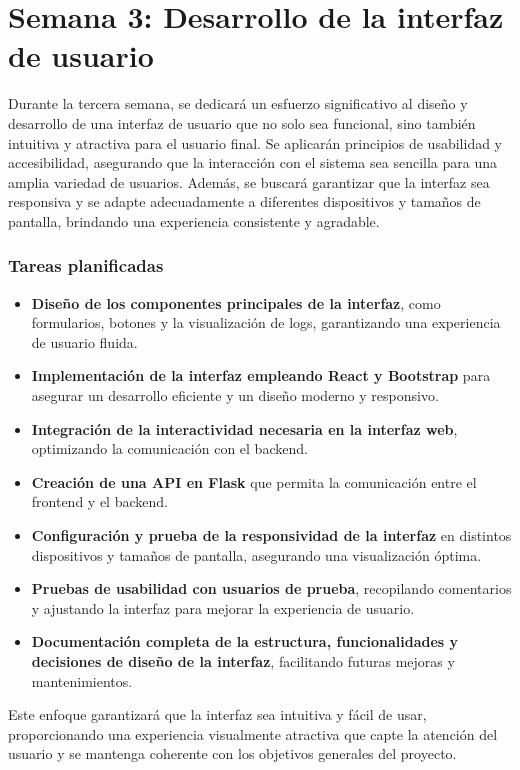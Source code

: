 \section{Semana 3: Desarrollo de la interfaz de usuario}
Durante la tercera semana, se dedicará un esfuerzo significativo al diseño y desarrollo de una interfaz de usuario que no solo sea funcional, sino también intuitiva y atractiva para el usuario final. Se aplicarán principios de usabilidad y accesibilidad, asegurando que la interacción con el sistema sea sencilla para una amplia variedad de usuarios. Además, se buscará garantizar que la interfaz sea responsiva y se adapte adecuadamente a diferentes dispositivos y tamaños de pantalla, brindando una experiencia consistente y agradable.

\subsubsection{Tareas planificadas}
\begin{itemize}
    \item \textbf{Diseño de los componentes principales de la interfaz}, como formularios, botones y la visualización de \glspl{log}, garantizando una experiencia de usuario fluida.
    \item \textbf{Implementación de la interfaz empleando React y Bootstrap} para asegurar un desarrollo eficiente y un diseño moderno y responsivo. \item \textbf{Integración de la interactividad necesaria en la interfaz web}, optimizando la comunicación con el backend. \item \textbf{Creación de una API en Flask} que permita la comunicación entre el frontend y el backend.
    \item \textbf{Configuración y prueba de la responsividad de la interfaz} en distintos dispositivos y tamaños de pantalla, asegurando una visualización óptima.
    \item \textbf{Pruebas de usabilidad con usuarios de prueba}, recopilando comentarios y ajustando la interfaz para mejorar la experiencia de usuario.
    \item \textbf{Documentación completa de la estructura, funcionalidades y decisiones de diseño de la interfaz}, facilitando futuras mejoras y mantenimientos.
\end{itemize}

Este enfoque garantizará que la interfaz sea intuitiva y fácil de usar, proporcionando una experiencia visualmente atractiva que capte la atención del usuario y se mantenga coherente con los objetivos generales del proyecto.

